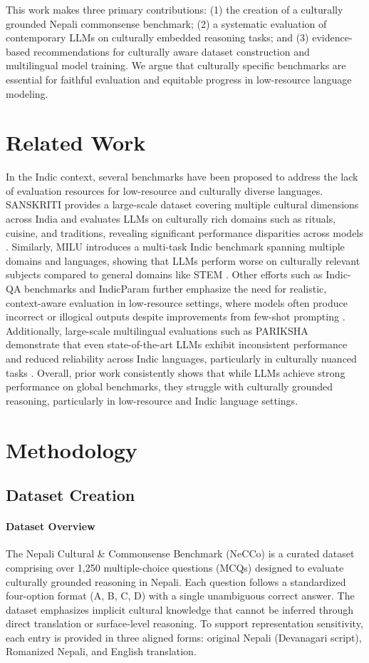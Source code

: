 \documentclass[10pt, a4paper]{article}
\begin{document}
This work makes three primary contributions: (1) the creation of a culturally grounded Nepali commonsense benchmark; (2) a systematic evaluation of contemporary LLMs on culturally embedded reasoning tasks; and (3) evidence-based recommendations for culturally aware dataset construction and multilingual model training. We argue that culturally specific benchmarks are essential for faithful evaluation and equitable progress in low-resource language modeling.

\section{Related Work}
\label{sec:append-how-prod}
In the Indic context, several benchmarks have been proposed to address the lack of evaluation resources for low-resource and culturally diverse languages. SANSKRITI provides a large-scale dataset covering multiple cultural dimensions across India and evaluates LLMs on culturally rich domains such as rituals, cuisine, and traditions, revealing significant performance disparities across models . Similarly, MILU introduces a multi-task Indic benchmark spanning multiple domains and languages, showing that LLMs perform worse on culturally relevant subjects compared to general domains like STEM .
Other efforts such as Indic-QA benchmarks and IndicParam further emphasize the need for realistic, context-aware evaluation in low-resource settings, where models often produce incorrect or illogical outputs despite improvements from few-shot prompting . Additionally, large-scale multilingual evaluations such as PARIKSHA demonstrate that even state-of-the-art LLMs exhibit inconsistent performance and reduced reliability across Indic languages, particularly in culturally nuanced tasks .
Overall, prior work consistently shows that while LLMs achieve strong performance on global benchmarks, they struggle with culturally grounded reasoning, particularly in low-resource and Indic language settings.

\section{Methodology}

\subsection{Dataset Creation}

\paragraph{Dataset Overview}
The Nepali Cultural \& Commonsense Benchmark (NeCCo) is a curated dataset comprising over 1,250 multiple-choice questions (MCQs) designed to evaluate culturally grounded reasoning in Nepali. Each question follows a standardized four-option format (A, B, C, D) with a single unambiguous correct answer. The dataset emphasizes implicit cultural knowledge that cannot be inferred through direct translation or surface-level reasoning. To support representation sensitivity, each entry is provided in three aligned forms: original Nepali (Devanagari script), Romanized Nepali, and English translation.
\end{document}
